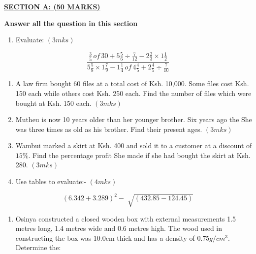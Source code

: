 \documentclass[
  a4paperpaper,
]{scrbook}
\providecommand{\tightlist}{%
  \setlength{\itemsep}{0pt}\setlength{\parskip}{0pt}}\usepackage{longtable,booktabs,array}
\begin{document}
\begin{tcolorbox}[enhanced jigsaw, left=2mm, colframe=quarto-callout-note-color-frame, toptitle=1mm, opacitybacktitle=0.6, rightrule=.15mm, colbacktitle=quarto-callout-note-color!10!white, colback=white, arc=.35mm, breakable, leftrule=.75mm, bottomtitle=1mm, bottomrule=.15mm, title=\textcolor{quarto-callout-note-color}{\faInfo}\hspace{0.5em}{Model Sample Paper 9}, titlerule=0mm, coltitle=black, toprule=.15mm, opacityback=0]

\ul{\textbf{SECTION A: (50 MARKS)}}

\textbf{Answer all the question in this section}

\begin{enumerate}
\def\labelenumi{\arabic{enumi}.}
\tightlist
\item
  Evaluate: \((3mks)\)
\end{enumerate}

\[\frac{\frac{3}{5}\,of\,30+5\frac{5}{6}\div\frac{7}{12}-2\frac{2}{3}\times 1\frac{1}{2}}{5\frac{5}{8}\times1\frac{7}{9}-1\frac{1}{4}\,of\,4\frac{4}{5}+2\frac{4}{5}\div\frac{7}{10}}\]

\begin{enumerate}
\def\labelenumi{\arabic{enumi}.}
\setcounter{enumi}{1}
\item
  A law firm bought 60 files at a total cost of Ksh. 10,000. Some files
  cost Ksh. 150 each while others cost Ksh. 250 each. Find the number of
  files which were bought at Ksh. 150 each. \((3mks)\)
\item
  Mutheu is now 10 years older than her younger brother. Six years ago
  the She was three times as old as his brother. Find their present
  ages. \((3mks)\)
\item
  Wambui marked a skirt at Ksh. 400 and sold it to a customer at a
  discount of \(15\%\). Find the percentage profit She made if she had
  bought the skirt at Ksh. 280. \((3mks)\)
\item
  Use tables to evaluate:- \((4mks)\)
\end{enumerate}

\[(6.342+3.289)^2-\sqrt[]{(432.85-124.45)}\]

\begin{enumerate}
\def\labelenumi{\arabic{enumi}.}
\setcounter{enumi}{5}
\item
  Osinya constructed a closed wooden box with external measurements 1.5
  metres long, 1.4 metres wide and 0.6 metres high. The wood used in
  constructing the box was 10.0cm thick and has a density of
  \(0.75g/cm^3\). Determine the:


\end{enumerate}
\end{tcolorbox}
\end{document}
